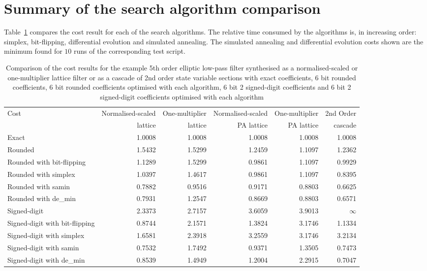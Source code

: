 \documentclass[a4paper,twoside,10pt,english]{report}
\begin{document}
\section{Summary of the search algorithm comparison}
Table~\ref{tab:search-algorithm-cost-summary} compares the cost result for
each of the search algorithms. The relative time consumed by the algorithms 
is, in increasing order: simplex, bit-flipping, differential evolution and
simulated annealing. The simulated annealing and differential evolution costs 
shown are the minimum found for $10$ runs of the corresponding test script.
\begin{table}[!hb]
\centering
\begin{threeparttable}
\begin{tabular}{lrrrrr} \toprule
Cost&Normalised-scaled&One-multiplier&Normalised-scaled&One-multiplier&2nd Order\\
&lattice&lattice&PA lattice&PA lattice& cascade\\
\midrule
Exact                          & 1.0008 & 1.0008 & 1.0008 & 1.0008 & 1.0008 \\
Rounded                        & 1.5432 & 1.5299 & 1.2459 & 1.1097 & 1.2362 \\
Rounded with bit-flipping      & 1.1289 & 1.5299 & 0.9861 & 1.1097 & 0.9929 \\
Rounded with simplex           & 1.0397 & 1.4617 & 0.9861 & 1.1097 & 0.8395 \\
Rounded with samin             & 0.7882 & 0.9516 & 0.9171 & 0.8803 & 0.6625 \\
Rounded with de\_min           & 0.7931 & 1.2547 & 0.8669 & 0.8803 & 0.6571 \\
Signed-digit                   & 2.3373 & 2.7157 & 3.6059 & 3.9013 & $\infty$ \\
Signed-digit with bit-flipping & 0.8744 & 2.1571 & 1.3824 & 3.1746 & 1.1334 \\
Signed-digit with simplex      & 1.6581 & 2.3918 & 3.2559 & 3.1746 & 3.2134 \\
Signed-digit with samin        & 0.7532 & 1.7492 & 0.9371 & 1.3505 & 0.7473 \\ 
Signed-digit with de\_min      & 0.8539 & 1.4949 & 1.2004 & 2.2915 & 0.7047 \\ 
\bottomrule
\end{tabular}
\end{threeparttable}
\caption[Comparison of cost results for each algorithm]
{Comparison of the cost results for the example 5th order
elliptic low-pass filter synthesised as a normalised-scaled or one-multiplier 
lattice filter or as a cascade of 2nd order state variable sections with exact 
coefficients, 6 bit rounded coefficients, 6 bit rounded coefficients optimised 
with each algorithm, 6 bit 2 signed-digit coefficients and 6 bit 2 signed-digit
coefficients optimised with each algorithm}
\label{tab:search-algorithm-cost-summary}
\end{table}
\end{document}
